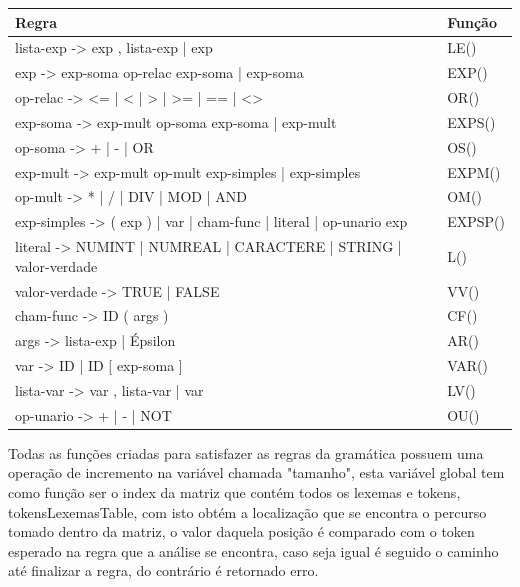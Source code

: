 \documentclass[12pt,oneside,a4paper,chapter=TITLE,section=TITLE,sumario=tradicional]{abntex2}
\begin{document}
\begin{quadro}[htb]
    \centering
    \vspace{0.5cm}
    \begin{tabular}[h]{|p{13.0cm}|p{2.0cm}|}
        \hline
        \textbf{Regra} & \textbf{Função} \\ 
        \hline\hline
	lista-exp  -> exp , lista-exp | exp  & LE() \\ \hline 
	exp -> exp-soma op-relac exp-soma | exp-soma  & EXP() \\ \hline 
	op-relac -> <= | < | > | >= | == | <>  & OR()   \\ \hline 
	exp-soma -> exp-mult op-soma exp-soma | exp-mult  & EXPS()   \\ \hline 
	op-soma -> + | - | OR  & OS()   \\ \hline 
	exp-mult -> exp-mult op-mult exp-simples | exp-simples  & EXPM()   \\ \hline 
	op-mult -> * | / | DIV | MOD | AND  & OM()   \\ \hline 
	exp-simples -> ( exp ) | var | cham-func | literal | op-unario exp  & EXPSP()   \\ \hline 
	literal -> NUMINT | NUMREAL | CARACTERE | STRING | valor-verdade  & L()   \\ \hline 
	valor-verdade -> TRUE | FALSE  & VV()   \\ \hline 
	cham-func -> ID ( args )  & CF()   \\ \hline 
	args -> lista-exp | Épsilon  & AR()   \\ \hline 
	var -> ID | ID [ exp-soma ]  & VAR()   \\ \hline 
	lista-var  -> var , lista-var | var  & LV()   \\ \hline 
	op-unario -> + | - | NOT  & OU()   \\ \hline 
    \end{tabular}
\end{quadro}

Todas as funções criadas para satisfazer as regras da gramática possuem uma operação de incremento na variável chamada "tamanho", esta variável global tem como função ser o index da matriz que contém todos os lexemas e tokens, tokensLexemasTable, com isto obtém a localização que se encontra o percurso tomado dentro da matriz, o valor daquela posição é comparado com o token esperado na regra que a análise se encontra, caso seja igual é seguido o caminho até finalizar a regra, do contrário é retornado erro.
\end{document}
